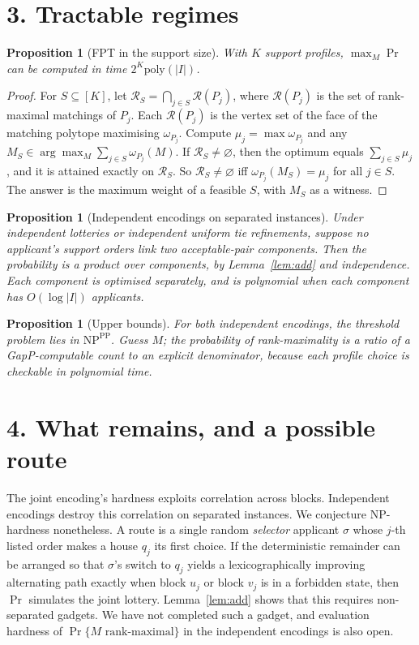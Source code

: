 \documentclass[11pt]{article}
\newtheorem{proposition}[theorem]{Proposition}
\theoremstyle{definition}
\begin{document}
\section*{3. Tractable regimes}
\begin{proposition}[FPT in the support size]\label{prop:fpt}
With $K$ support profiles, $\max_M\Pr$ can be computed in time $2^K\mathrm{poly}(|I|)$.
\end{proposition}
\begin{proof}
For $S\subseteq[K]$, let $\mathcal R_S=\bigcap_{j\in S}\mathcal R(P_j)$, where $\mathcal R(P_j)$ is the set of
rank-maximal matchings of $P_j$. Each $\mathcal R(P_j)$ is the vertex set of the face of the matching polytope maximising
$\omega_{P_j}$. Compute $\mu_j=\max\omega_{P_j}$ and any $M_S\in\arg\max_M\sum_{j\in S}\omega_{P_j}(M)$. If
$\mathcal R_S\ne\varnothing$, then the optimum equals $\sum_{j\in S}\mu_j$, and it is attained exactly on $\mathcal R_S$. So
$\mathcal R_S\ne\varnothing$ iff $\omega_{P_j}(M_S)=\mu_j$ for all $j\in S$. The answer is the maximum weight of a
feasible $S$, with $M_S$ as a witness.
\end{proof}

\begin{proposition}[Independent encodings on separated instances]
Under independent lotteries or independent uniform tie refinements, suppose no applicant's support orders link two
acceptable-pair components. Then the probability is a product over components, by Lemma~\ref{lem:add} and independence.
Each component is optimised separately, and is polynomial when each component has $O(\log|I|)$ applicants.
\end{proposition}

\begin{proposition}[Upper bounds]
For both independent encodings, the threshold problem lies in $\mathrm{NP}^{\mathrm{PP}}$. Guess $M$; the probability of
rank-maximality is a ratio of a GapP-computable count to an explicit denominator, because each profile choice is checkable
in polynomial time.
\end{proposition}

\section*{4. What remains, and a possible route}
The joint encoding's hardness exploits correlation across blocks. Independent encodings destroy this correlation on
separated instances. We conjecture NP-hardness nonetheless. A route is a single random \emph{selector} applicant $\sigma$
whose $j$-th listed order makes a house $q_j$ its first choice. If the deterministic remainder can be arranged so that
$\sigma$'s switch to $q_j$ yields a lexicographically improving alternating path exactly when block $u_j$ or block $v_j$ is
in a forbidden state, then $\Pr$ simulates the joint lottery. Lemma~\ref{lem:add} shows that this requires non-separated
gadgets. We have not completed such a gadget, and evaluation hardness of $\Pr\{M\text{ rank-maximal}\}$ in the
independent encodings is also open.
\end{document}
